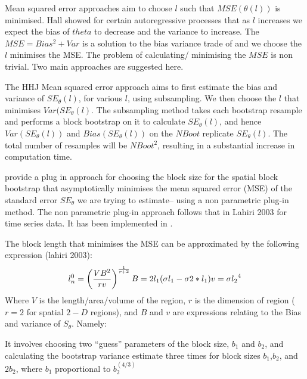 \documentclass[a4paper,12pt]{article}
\begin{document}


Mean squared error approaches aim to choose $l$ such that $MSE(\theta(l))$ is minimised. Hall showed for certain autoregressive processes that as $l$ increases we expect the bias of $theta$ to decrease and the variance to increase. The $MSE= Bias^2+Var$ is a solution to the bias variance trade of and we choose the $l$ minimises the MSE. The problem of calculating/ minimising the $MSE$ is non trivial. Two main approaches are suggested here. 

The HHJ Mean squared error approach aims to first estimate the bias and variance of $SE_\theta(l)$, for various $l$, using subsampling. We then choose the $l$ that minimises $Var(SE_\theta(l)$. The subsampling method takes each bootstrap resample and performs a block bootstrap on it to calculate $SE_\theta(l)$, and hence $Var(SE_\theta(l))$ and $Bias(SE_\theta(l))$ on the $NBoot$ replicate $SE_\theta(l)$. The total number of resamples will be $NBoot^2$, resulting in a substantial increase in computation time.

\cite{nordman2007optimal} provide a plug in approach for choosing the block size for the spatial block bootstrap that asymptotically minimises the mean squared error (MSE) of the standard error $SE_\theta$ we are trying to estimate-- using a non parametric plug-in method. The non parametric plug-in approach follows that in Lahiri 2003 for time series data. It has been implemented in \citep{liu2011investigating}. 

The block length that minimises the MSE can be approximated by the following expression (lahiri 2003):
\begin{equation}
l^0_n = \left(\frac{VB^2}{rv}\right)^{\frac{1}{r+2}}\\
B=2l_1(\sigma{l_1}-\sigma{2*l_1})\\
v=\sigma{l_2}^4
\end{equation}
Where $V$ is the length/area/volume of the region, $r$ is the dimension of region ($r=2$ for spatial $2-D$ regions), and $B$ and $v$ are expressions relating to the Bias and variance of $S_{\theta}$. Namely:


 It involves choosing two ``guess'' parameters of the block size, $b_1$ and $b_2$, and calculating the bootstrap variance estimate three times for block sizes $b_1$,$b_2$, and $2b_2$, where $b_1$ proportional to $b_2^{(4/3)}$
\end{document}
